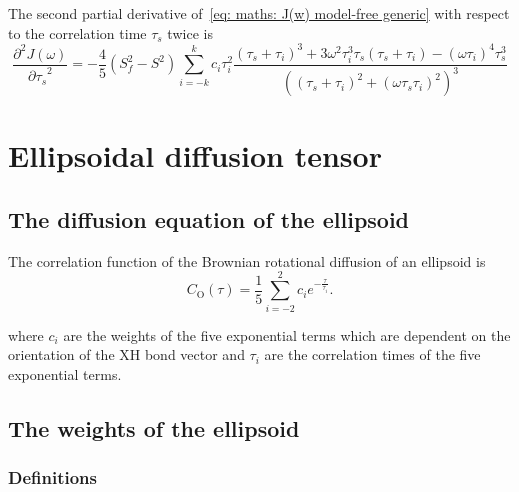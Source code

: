 The second partial derivative of~\eqref{eq: maths: J(w) model-free generic} with respect to the correlation time $\tau_s$ twice is
\begin{equation}
    \frac{\partial^2 J(\omega)}{{\partial \tau_s}^2} = -\frac{4}{5} (S^2_f - S^2) \sum_{i=-k}^k c_i \tau_i^2
        \frac{(\tau_s + \tau_i)^3  +  3 \omega^2 \tau_i^3 \tau_s (\tau_s + \tau_i)  -  (\omega \tau_i)^4 \tau_s^3}
            {\left((\tau_s + \tau_i)^2 + (\omega \tau_s \tau_i)^2 \right)^3}
\end{equation}





\newpage
\section{Ellipsoidal diffusion tensor}





\subsection{The diffusion equation of the ellipsoid} \label{ellipsoid equation}

The correlation function of the Brownian rotational diffusion of an ellipsoid is
\begin{equation} \label{eq: ellipsoid correlation function}
    C_\mathrm{O}(\tau) = \frac{1}{5} \sum^2_{i=-2} c_i e^{-\frac{\tau}{\tau_i}}.
\end{equation}

\noindent where $c_i$ are the weights of the five exponential terms which are dependent on the orientation of the XH bond vector and $\tau_i$ are the correlation times of the five exponential terms.




\subsection{The weights of the ellipsoid}


\subsubsection{Definitions}

